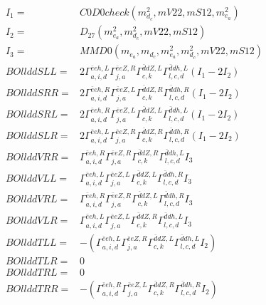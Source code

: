 \documentclass[A4,landscape]{article}
\begin{document}
\begin{align} 
I_1 = & C0D0check(m^2_{d_{{c}}}, mV22, mS12, m^2_{e_{{a}}}) \\ 
I_2 = & D_{27}(m^2_{e_{{a}}}, m^2_{d_{{c}}}, mV22, mS12) \\ 
I_3 = & MMD0(m_{e_{{a}}}, m_{d_{{c}}}, m^2_{e_{{a}}}, m^2_{d_{{c}}}, mV22, mS12) \\ 
  BOllddSLL= & 2  \Gamma^{\bar{e}e h ,L}_{a, i, d} \Gamma^{\bar{e}e Z ,R}_{j, a} \Gamma^{\bar{d}d Z ,L}_{c, k} \Gamma^{\bar{d}d h ,L}_{l, c, d} (I_1 - 2 I_2) \\ 
  BOllddSRR= & 2  \Gamma^{\bar{e}e h ,R}_{a, i, d} \Gamma^{\bar{e}e Z ,L}_{j, a} \Gamma^{\bar{d}d Z ,R}_{c, k} \Gamma^{\bar{d}d h ,R}_{l, c, d} (I_1 - 2 I_2) \\ 
  BOllddSRL= & 2  \Gamma^{\bar{e}e h ,R}_{a, i, d} \Gamma^{\bar{e}e Z ,L}_{j, a} \Gamma^{\bar{d}d Z ,L}_{c, k} \Gamma^{\bar{d}d h ,L}_{l, c, d} (I_1 - 2 I_2) \\ 
  BOllddSLR= & 2  \Gamma^{\bar{e}e h ,L}_{a, i, d} \Gamma^{\bar{e}e Z ,R}_{j, a} \Gamma^{\bar{d}d Z ,R}_{c, k} \Gamma^{\bar{d}d h ,R}_{l, c, d} (I_1 - 2 I_2) \\ 
  BOllddVRR= &  \Gamma^{\bar{e}e h ,R}_{a, i, d} \Gamma^{\bar{e}e Z ,R}_{j, a} \Gamma^{\bar{d}d Z ,R}_{c, k} \Gamma^{\bar{d}d h ,L}_{l, c, d} I_3 \\ 
  BOllddVLL= &  \Gamma^{\bar{e}e h ,L}_{a, i, d} \Gamma^{\bar{e}e Z ,L}_{j, a} \Gamma^{\bar{d}d Z ,L}_{c, k} \Gamma^{\bar{d}d h ,R}_{l, c, d} I_3 \\ 
  BOllddVRL= &  \Gamma^{\bar{e}e h ,R}_{a, i, d} \Gamma^{\bar{e}e Z ,R}_{j, a} \Gamma^{\bar{d}d Z ,L}_{c, k} \Gamma^{\bar{d}d h ,R}_{l, c, d} I_3 \\ 
  BOllddVLR= &  \Gamma^{\bar{e}e h ,L}_{a, i, d} \Gamma^{\bar{e}e Z ,L}_{j, a} \Gamma^{\bar{d}d Z ,R}_{c, k} \Gamma^{\bar{d}d h ,L}_{l, c, d} I_3 \\ 
  BOllddTLL= & -( \Gamma^{\bar{e}e h ,L}_{a, i, d} \Gamma^{\bar{e}e Z ,R}_{j, a} \Gamma^{\bar{d}d Z ,L}_{c, k} \Gamma^{\bar{d}d h ,L}_{l, c, d} I_2) \\ 
  BOllddTLR= & 0 \\ 
  BOllddTRL= & 0 \\ 
  BOllddTRR= & -( \Gamma^{\bar{e}e h ,R}_{a, i, d} \Gamma^{\bar{e}e Z ,L}_{j, a} \Gamma^{\bar{d}d Z ,R}_{c, k} \Gamma^{\bar{d}d h ,R}_{l, c, d} I_2) \\ 
\end{align} 
\end{document}
